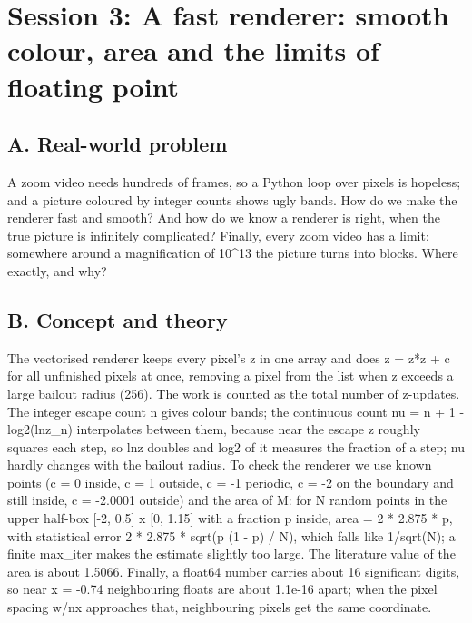 \documentclass[11pt,a4paper]{article}
\begin{document}
\section{Session 3: A fast renderer: smooth colour, area and the limits of floating point}

\subsection*{A. Real-world problem}
A zoom video needs hundreds of frames, so a Python loop over pixels is hopeless; and a picture coloured by integer counts shows ugly bands. How do we make the renderer fast and smooth? And how do we know a renderer is right, when the true picture is infinitely complicated? Finally, every zoom video has a limit: somewhere around a magnification of 10\textasciicircum{}13 the picture turns into blocks. Where exactly, and why?

\subsection*{B. Concept and theory}
The vectorised renderer keeps every pixel's z in one array and does z = z*z + c for all unfinished pixels at once, removing a pixel from the list when \textbar{}z\textbar{} exceeds a large bailout radius (256). The work is counted as the total number of z-updates. The integer escape count n gives colour bands; the continuous count nu = n + 1 - log2(ln\textbar{}z\_n\textbar{}) interpolates between them, because near the escape \textbar{}z\textbar{} roughly squares each step, so ln\textbar{}z\textbar{} doubles and log2 of it measures the fraction of a step; nu hardly changes with the bailout radius. To check the renderer we use known points (c = 0 inside, c = 1 outside, c = -1 periodic, c = -2 on the boundary and still inside, c = -2.0001 outside) and the area of M: for N random points in the upper half-box [-2, 0.5] x [0, 1.15] with a fraction p inside, area = 2 * 2.875 * p, with statistical error 2 * 2.875 * sqrt(p (1 - p) / N), which falls like 1/sqrt(N); a finite max\_iter makes the estimate slightly too large. The literature value of the area is about 1.5066. Finally, a float64 number carries about 16 significant digits, so near x = -0.74 neighbouring floats are about 1.1e-16 apart; when the pixel spacing w/nx approaches that, neighbouring pixels get the same coordinate.
\end{document}
